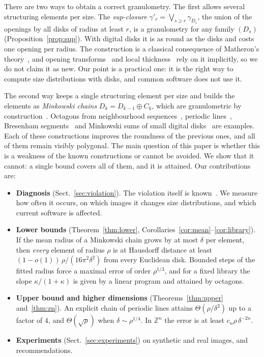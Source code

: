 \documentclass[runningheads]{llncs}
\newcommand{\Z}{\mathbb{Z}}
\begin{document}
There are two ways to obtain a correct granulometry. The first allows several structuring elements per size. The \emph{sup-closure} $\gamma'_r=\bigvee_{s\ge r}\gamma_{D_s}$, the union of the openings by all disks of radius at least $r$, is a granulometry for any family $(D_s)$ (Proposition~\ref{prop:sup}). With digital disks it is as round as the disks and costs one opening per radius. The construction is a classical consequence of Matheron's theory~\cite{matheron1975,serra1982}, and opening transforms~\cite{vincent1994} and local thickness~\cite{hildebrand1997} rely on it implicitly, so we do not claim it as new. Our point is a practical one: it is the right way to compute size distributions with disks, and common software does not use it.

The second way keeps a single structuring element per size and builds the elements as \emph{Minkowski chains} $D_k=D_{k-1}\oplus C_k$, which are granulometric by construction~\cite{adams1993,jones1996,soille2003,vincent1994}. Octagons from neighbourhood sequences~\cite{farkas2006}, periodic lines~\cite{jones1996}, Bresenham segments~\cite{adams1993} and Minkowski sums of small digital disks~\cite{song2019} are examples. Each of these constructions improves the roundness of the previous ones, and all of them remain visibly polygonal. The main question of this paper is whether this is a weakness of the known constructions or cannot be avoided. We show that it cannot: a single bound covers all of them, and it is attained. Our contributions are:
\begin{itemize}
\item \textbf{Diagnosis} (Sect.~\ref{sec:violation}). The violation itself is known~\cite{vogt1988}. We measure how often it occurs, on which images it changes size distributions, and which current software is affected.
\item \textbf{Lower bounds} (Theorem~\ref{thm:lower}, Corollaries~\ref{cor:mean}--\ref{cor:library}). If the mean radius of a Minkowski chain grows by at most $\delta$ per element, then \emph{every} element of radius $\rho$ is at Hausdorff distance at least $(1-o(1))\,\rho/(16\pi^2\delta^2)$ from every Euclidean disk. Bounded steps of the fitted radius force a maximal error of order $\rho^{1/3}$, and for a fixed library the slope $\kappa/(1+\kappa)$ is given by a linear program and attained by octagons.
\item \textbf{Upper bound and higher dimensions} (Theorems~\ref{thm:upper} and~\ref{thm:zn}). An explicit chain of periodic lines attains $\Theta(\rho/\delta^2)$ up to a factor of 4, and $\Theta(\sqrt\rho)$ when $\delta\sim\rho^{1/4}$. In $\Z^n$ the error is at least $c_n\rho\,\delta^{-2n}$.
\item \textbf{Experiments} (Sect.~\ref{sec:experiments}) on synthetic and real images, and recommendations.
\end{itemize}
\end{document}
